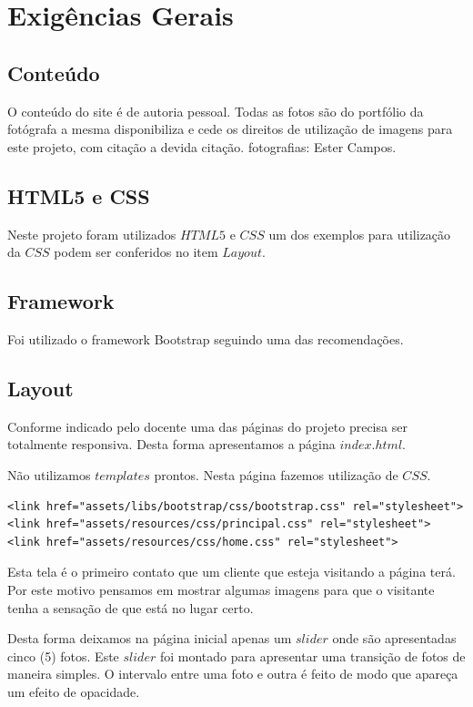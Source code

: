 \chapter{Exigências Gerais}
\section{Conteúdo}

	O conteúdo do site é de autoria pessoal. Todas as fotos são do portfólio da fotógrafa a mesma disponibiliza e cede os direitos de utilização de imagens para este projeto, com citação a devida citação.
	fotografias: Ester Campos.

\section{HTML5 e CSS}

	Neste projeto foram utilizados $HTML5$ e $CSS$ um dos exemplos para utilização da $CSS$ podem ser conferidos no item $Layout$.
	
     
\section{Framework}

	Foi utilizado o framework Bootstrap seguindo uma das recomendações.

\section{Layout}
	Conforme indicado pelo docente uma das páginas do projeto precisa ser totalmente responsiva. Desta forma apresentamos a página $index.html$.
	
	Não utilizamos $templates$ prontos. Nesta página fazemos utilização de $CSS$.
	
\begin{lstlisting}
<link href="assets/libs/bootstrap/css/bootstrap.css" rel="stylesheet">
<link href="assets/resources/css/principal.css" rel="stylesheet">
<link href="assets/resources/css/home.css" rel="stylesheet">
\end{lstlisting}	
	
	Esta tela é o primeiro contato que um cliente que esteja visitando a página terá. Por este motivo pensamos em mostrar algumas imagens para que o visitante tenha a sensação de que está no lugar certo. 
	
	Desta forma deixamos na página inicial apenas um $slider$ onde são apresentadas cinco (5) fotos. Este $slider$ foi montado para apresentar uma transição de fotos de maneira simples. O intervalo entre uma foto e outra é feito de modo que apareça um efeito de opacidade.
	
